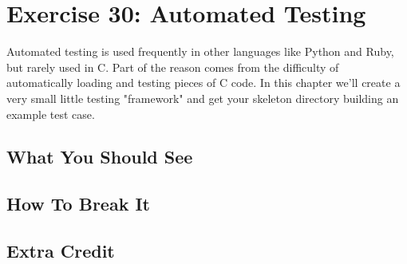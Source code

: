 \chapter{Exercise 30: Automated Testing}

Automated testing is used frequently in other languages like Python and Ruby, but
rarely used in C.  Part of the reason comes from the difficulty of automatically
loading and testing pieces of C code.  In this chapter we'll create a very small
little testing "framework" and get your skeleton directory building an example
test case.

\section{What You Should See}


\section{How To Break It}


\section{Extra Credit}



